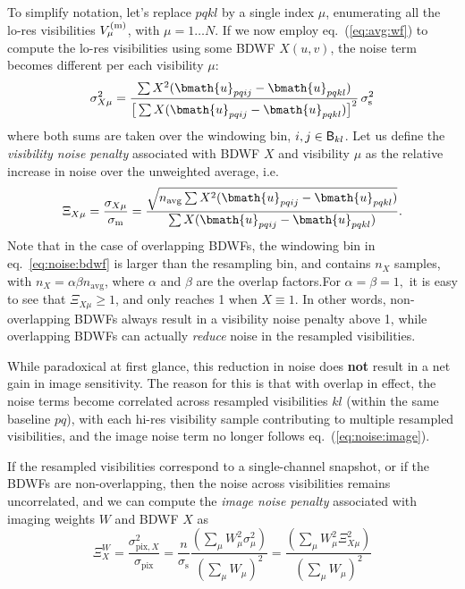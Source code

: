 \documentclass[useAMS,usenatbib]{mn2e}
\begin{document}
To simplify notation, let's replace $pqkl$ by a single index $\mu$, enumerating all the lo-res visibilities $V^\mathrm{(m)}_\mu$, with 
$\mu=1\dots N$. If we now employ eq.~(\ref{eq:avg:wf}) to compute the lo-res visibilities using some BDWF $X(u,v)$, the noise 
term becomes different per each visibility $\mu$:
\begin{equation}
\label{eq:noise:bdwf}
\sigma_{X\mu}^2 = \frac{\sum X^2(\bmath{u}_{pqij}-\bmath{u}_{pqkl})}
{\big [ \sum X(\bmath{u}_{pqij}-\bmath{u}_{pqkl}) \big ]^2 } \, \sigma_\mathrm{s}^2
\end{equation}
where both sums are taken over the windowing bin, ${i,j}\in \mathsf{B}_{kl}$. Let us define 
the \emph{visibility noise penalty} associated with BDWF $X$ 
and visibility $\mu$ as the relative increase in noise over the unweighted average, i.e.
\begin{equation}
\Xi_{X\mu} = \frac{\sigma_{X\mu}}{\sigma_\mathrm{m}} = 
\frac{ \sqrt{ n_\mathrm{avg} \sum X^2(\bmath{u}_{pqij}-\bmath{u}_{pqkl}) }}
{\sum X(\bmath{u}_{pqij}-\bmath{u}_{pqkl}) }. 
\end{equation}
Note that in the case of overlapping BDWFs, the windowing bin in eq.~\ref{eq:noise:bdwf} is larger than the 
resampling bin, and contains $n_X$ samples, with $n_X=\alpha\beta n_\mathrm{avg}$, where $\alpha$ and $\beta$ are the 
overlap factors.For $\alpha=\beta=1,$ it is easy to see that $\Xi_{X\mu}\geq1$, and only reaches 1 when $X\equiv1$. 
In other words, non-overlapping BDWFs always result in a visibility noise penalty above 1, while overlapping BDWFs 
can actually \emph{reduce} noise in the resampled visibilities. 

While paradoxical at first glance, this reduction in noise does {\bf not} result in a net gain in image 
sensitivity. The reason for this is that with overlap in effect, the noise terms become correlated across 
resampled visibilities $kl$ (within the same baseline $pq$), with each hi-res visibility sample contributing to 
multiple resampled visibilities, and the image noise term no longer follows eq.~(\ref{eq:noise:image}).

If the resampled visibilities correspond to a single-channel snapshot, or if the BDWFs are non-overlapping,
then the noise across visibilities remains uncorrelated, and we can compute the \emph{image noise penalty} 
associated with imaging weights $W$ and BDWF $X$ as
\begin{equation}
\Xi^W_X = 
\frac{\sigma_{\mathrm{pix},X}^2}{\sigma_{\mathrm{pix}}} = \frac{n}{\sigma_\mathrm{s}}
\frac{ (\sum_{\mu} W_{\mu}^2 \sigma_\mu^2) }{  (\sum_{\mu} W_{\mu})^2 } =
\frac{ (\sum_{\mu} W_{\mu}^2 \Xi_{X\mu}^2) }{ (\sum_{\mu} W_{\mu})^2 } 
\end{equation}
\end{document}
